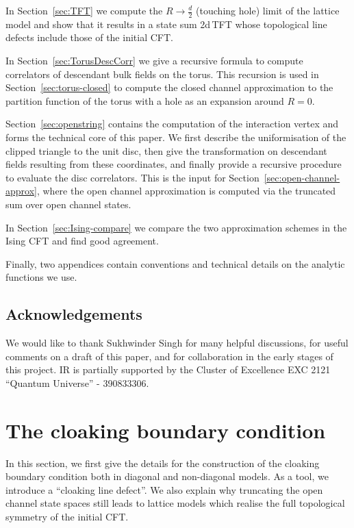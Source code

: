 \documentclass[11pt,a4paper]{article}
\numberwithin{equation}{section}
\begin{document}
In Section~\ref{sec:TFT} we compute the $R \to \frac d2$ (touching hole) limit of the lattice model and show that it results in a state sum 2d\,TFT whose topological line defects include those of the initial CFT.

In Section~\ref{sec:TorusDescCorr} we give a recursive formula to compute correlators of descendant bulk fields on the torus.
This recursion is used in Section~\ref{sec:torus-closed} to compute the closed channel approximation to the partition function of the torus with a hole as an expansion around $R=0$.

Section~\ref{sec:openstring} contains the computation of the interaction vertex and forms the technical core of this paper. We first describe the uniformisation of the clipped triangle to the unit disc, then give the transformation on descendant fields resulting from these coordinates, and finally provide a recursive procedure to evaluate the disc correlators. 
This is the input for Section~\ref{sec:open-channel-approx}, where the open channel approximation is computed via the truncated sum over open channel states.

In Section~\ref{sec:Ising-compare} we compare the two approximation schemes in the Ising CFT and find good agreement.

Finally, two appendices contain conventions and technical details on the analytic functions we use.


\subsection*{Acknowledgements}

We would like to thank Sukhwinder Singh for many helpful discussions, for useful comments on a draft of this paper, and for collaboration in the early stages of this project.
IR is partially supported by the Cluster of Excellence EXC 2121 ``Quantum Universe'' - 390833306. 

\newpage
\section{The cloaking boundary condition}
\label{sec:cloaking-bnd}

In this section, we first give the details for the construction of the cloaking boundary condition both in diagonal and non-diagonal models. As a tool, we introduce a ``cloaking line defect''. 
We also explain why truncating the open channel state spaces still leads to lattice models which realise the full topological symmetry of the initial CFT.
\end{document}
